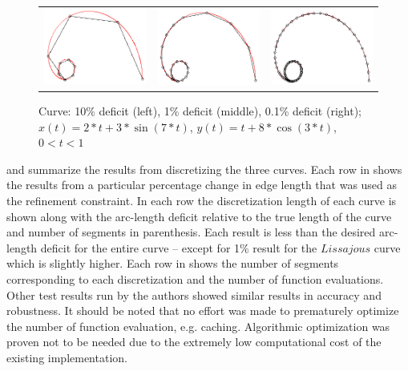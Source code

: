 \begin{figure}[h!]
  \centering
  \begin{tabular}{ccc}
  \includegraphics[width=0.3\linewidth]{Figures/cochleoid01.png} &
  \includegraphics[width=0.3\linewidth]{Figures/cochleoid001.png} &
  \includegraphics[width=0.3\linewidth]{Figures/cochleoid0001.png}
  \end{tabular}
  \caption{\label{fig:lastfigure} Curve: 10\% deficit (left), 1\% deficit (middle), 0.1\% deficit (right);\newline $x(t) = 2*t + 3*\sin(7*t)$, $y(t) = t + 8*\cos(3*t)$, $0<t<1$}
  \end{figure}

 and  summarize the results from discretizing the three curves. Each row in  shows the results from a particular percentage change in edge length that was used as the refinement constraint. In each row the discretization length of each curve is shown along with the arc-length deficit relative to the true length of the curve and number of segments in parenthesis. Each result is less than the desired arc-length deficit for the entire curve -- except for 1\% result for the $Lissajous$ curve which is slightly higher. Each row in  shows the number of segments corresponding to each discretization and the number of function evaluations. Other test results run by the authors showed similar results in accuracy and robustness. It should be noted that no effort was made to prematurely optimize the number of function evaluation, e.g. caching. Algorithmic optimization was proven not to be needed due to the extremely low computational cost of the existing implementation.

